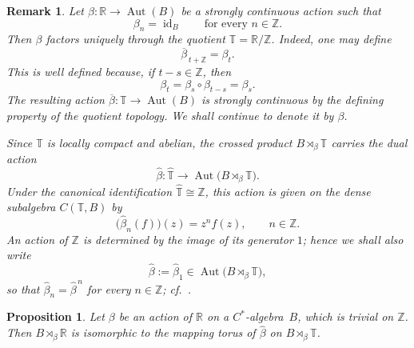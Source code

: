 \documentclass{book}
\newtheorem{proposition}[definition]{Proposition}
\newtheorem{remark}[definition]{Remark}
\def\cstar{\(C^*\)-algebra}
\begin{document}
\begin{remark}\label{remark:action-descends-to-torus}
  Let \(\beta:\mathbb{R}\to\operatorname{Aut}(B)\) be a strongly
  continuous action such that
  \[
    \beta_n=\operatorname{id}_B
    \qquad\text{for every }n\in\mathbb{Z}.
  \]
  Then \(\beta\) factors uniquely through the quotient
  \(\mathbb{T}=\mathbb{R}/\mathbb{Z}\). Indeed, one may define
  \[
    \overline{\beta}_{\,t+\mathbb{Z}}=\beta_t.
  \]
  This is well defined because, if \(t-s\in\mathbb{Z}\), then
  \[
    \beta_t
    =
    \beta_s\circ\beta_{t-s}
    =
    \beta_s.
  \]
  The resulting action
  \(\overline{\beta}:\mathbb{T}\to\operatorname{Aut}(B)\) is strongly
  continuous by the defining property of the quotient topology. We
  shall continue to denote it by \(\beta\).

  Since \(\mathbb{T}\) is locally compact and abelian, the crossed
  product \(B\rtimes_\beta\mathbb{T}\) carries the dual action
  \[
    \hat{\beta}:
    \hat{\mathbb{T}}
    \longrightarrow
    \operatorname{Aut}
    \bigl(B\rtimes_\beta\mathbb{T}\bigr).
  \]
  Under the canonical identification
  \(\hat{\mathbb{T}}\cong\mathbb{Z}\), this action is given on the
  dense subalgebra \(C(\mathbb{T},B)\) by
  \[
    \bigl(\hat{\beta}_n(f)\bigr)(z)
    =
    z^n f(z),
    \qquad
    n\in\mathbb{Z}.
  \]
  An action of \(\mathbb{Z}\) is determined by the image of its
  generator \(1\); hence we shall also write
  \[
    \hat{\beta}
    :=
    \hat{\beta}_1
    \in
    \operatorname{Aut}
    \bigl(B\rtimes_\beta\mathbb{T}\bigr),
  \]
  so that \(\hat{\beta}_n=\hat{\beta}^{\,n}\) for every
  \(n\in\mathbb{Z}\); cf.~\cite[Section~10.3]{Blackadar1998}.
\end{remark}
\begin{proposition}
  Let \(\beta\) be an action of \(\mathbb{R}\) on a \cstar\ \(B\), which is trivial on \(\mathbb{Z}\).
  Then \(B\rtimes_\beta\mathbb{R}\) is isomorphic to the mapping torus of \(\hat{\beta}\) on \(B\rtimes_\beta\mathbb{T}\).
\end{proposition}
\end{document}
